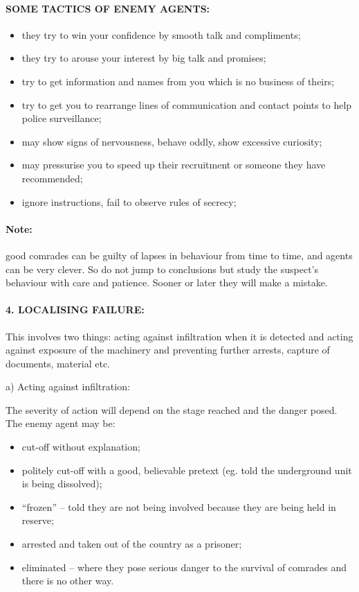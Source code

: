 \paragraph{SOME TACTICS OF ENEMY AGENTS:}

\begin{itemize}
\tightlist
\item
  they try to win your confidence by smooth talk and compliments;
\item
  they try to arouse your interest by big talk and promises;
\item
  try to get information and names from you which is no business of
  theirs;
\item
  try to get you to rearrange lines of communication and contact points
  to help police surveillance;
\item
  may show signs of nervousness, behave oddly, show excessive curiosity;
\item
  may pressurise you to speed up their recruitment or someone they have
  recommended;
\item
  ignore instructions, fail to observe rules of secrecy;
\end{itemize}

\paragraph{Note:}

good comrades can be guilty of lapses in behaviour from time to time,
and agents can be very clever. So do not jump to conclusions but study
the suspect's behaviour with care and patience. Sooner or later they
will make a mistake.

\paragraph{4. LOCALISING FAILURE:}

This involves two things: acting against infiltration when it is
detected and acting against exposure of the machinery and preventing
further arrests, capture of documents, material etc.

a) Acting against infiltration:

The severity of action will depend on the stage reached and the danger
posed. The enemy agent may be:

\begin{itemize}
\tightlist
\item
  cut-off without explanation;
\item
  politely cut-off with a good, believable pretext (eg. told the
  underground unit is being dissolved);
\item
  ``frozen'' -- told they are not being involved because they are being
  held in reserve;
\item
  arrested and taken out of the country as a prisoner;
\item
  eliminated -- where they pose serious danger to the survival of
  comrades and there is no other way.
\end{itemize}

